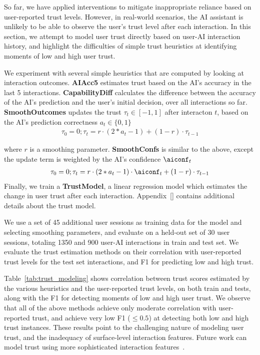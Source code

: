 So far, we have applied interventions to mitigate inappropriate reliance based on user-reported trust levels. 
However, in real-world scenarios, the AI assistant is unlikely to be able to observe the user's trust level after each interaction. 
In this section, we attempt to model user trust directly based on user-AI interaction history, and highlight the difficulties of simple trust heuristics at identifying moments of low and high user trust.

We experiment with several simple heuristics that are computed by looking at interaction outcomes. \textbf{AIAcc5} estimates trust based on the AI's accuracy in the last 5 interactions. \textbf{CapabilityDiff} calculates the difference between the accuracy of the AI's prediction and the user's initial decision, over all interactions so far. 
\textbf{SmoothOutcomes} updates the trust $\tau_t \in [-1, 1]$ after interacton $t$, based on the AI's prediction correctness $a_t \in \{0,1\}$
\vspace{-0.5em}
\begin{align*}
    \tau_0 = 0; \tau_t = r \cdot (2 * a_t-1) + (1-r) \cdot \tau_{t-1}
\end{align*}

where $r$ is a smoothing parameter. \textbf{SmoothConfs} is similar to the above, except the update term is weighted by the AI's confidence $\aiconf_t$
\vspace{-0.5em}
\begin{align*}
    \tau_0 = 0; \tau_t = r \cdot (2 * a_t-1) \cdot \aiconf_t + (1-r) \cdot \tau_{t-1}
\end{align*}
Finally, we train a \textbf{TrustModel}, a linear regression model which estimates the change in user trust after each interaction. 
Appendix~\ref{} contains additional details about the trust model.

We use a set of 45 additional user sessions as training data for the model and selecting smoothing parameters, and evaluate on a held-out set of 30 user sessions, totaling 1350 and 900 user-AI interactions in train and test set. 
We evaluate the trust estimation methods on their correlation with user-reported trust levels for the test set interactions, and F1 for predicting low and high trust. 



Table~\ref{tab:trust_modeling} shows correlation between trust scores estimated by the various heuristics and the user-reported trust levels, on both train and tests, along with the F1 for detecting moments of low and high user trust. 
We observe that all of the above methods achieve only moderate correlation with user-reported trust, and achieve very low F1 ($\leq 0.5$) at detecting both low and high trust instances. 
These results point to the challenging nature of modeling user trust, and the inadequacy of surface-level interaction features. 
Future work can model trust using more sophisticated interaction features~\cite{fang2013trust}.